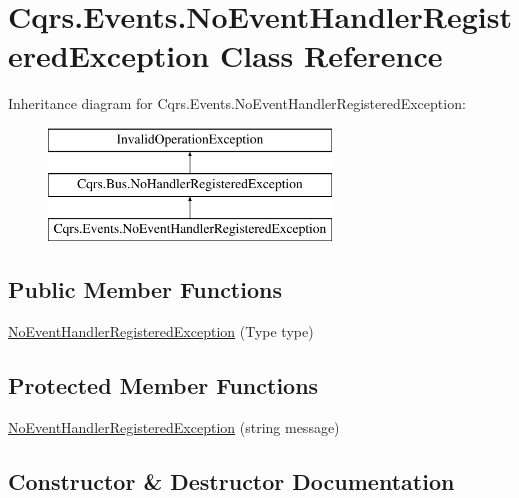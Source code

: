 \hypertarget{classCqrs_1_1Events_1_1NoEventHandlerRegisteredException}{}\section{Cqrs.\+Events.\+No\+Event\+Handler\+Registered\+Exception Class Reference}
\label{classCqrs_1_1Events_1_1NoEventHandlerRegisteredException}
Inheritance diagram for Cqrs.\+Events.\+No\+Event\+Handler\+Registered\+Exception\+:\begin{figure}[H]
\begin{center}
\leavevmode
\includegraphics[height=3.000000cm]{classCqrs_1_1Events_1_1NoEventHandlerRegisteredException}
\end{center}
\end{figure}
\subsection*{Public Member Functions}
\begin{DoxyCompactItemize}
\item 
\hyperlink{classCqrs_1_1Events_1_1NoEventHandlerRegisteredException_a07a69b1708c7352f7ed4945bd59cfc3e}{No\+Event\+Handler\+Registered\+Exception} (Type type)
\end{DoxyCompactItemize}
\subsection*{Protected Member Functions}
\begin{DoxyCompactItemize}
\item 
\hyperlink{classCqrs_1_1Events_1_1NoEventHandlerRegisteredException_aa09c7226056f4da196f46165cb4b2fb3}{No\+Event\+Handler\+Registered\+Exception} (string message)
\end{DoxyCompactItemize}


\subsection{Constructor \& Destructor Documentation}
\mbox{\label{classCqrs_1_1Events_1_1NoEventHandlerRegisteredException_a07a69b1708c7352f7ed4945bd59cfc3e}} 
